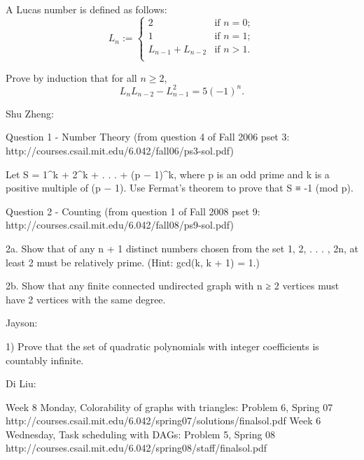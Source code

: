 \begin{problem}[Induction]

A Lucas number is defined as follows:
\begin{equation}
  L_n :=
  \begin{cases}
    2               & \text{if } n = 0; \\
    1               & \text{if } n = 1; \\
    L_{n-1}+L_{n-2} & \text{if } n > 1. \\
   \end{cases}
\end{equation}

Prove by induction that for all $n \geq 2$,
\[
L_n L_{n-2} - L_{n-1}^2 = 5 (-1)^n.
\]
\end{problem}


Shu Zheng:

Question 1 - Number Theory (from question 4 of Fall 2006 pset 3:
http://courses.csail.mit.edu/6.042/fall06/ps3-sol.pdf)

Let S = 1^k + 2^k + . . . + (p − 1)^k, where p is an odd prime and k
is a positive multiple of (p − 1). Use Fermat’s theorem to prove that
S ≡ -1 (mod p).

Question 2 - Counting (from question 1 of Fall 2008 pset 9:
http://courses.csail.mit.edu/6.042/fall08/ps9-sol.pdf)

2a. Show that of any n + 1 distinct numbers chosen from the set {1, 2,
  . . . , 2n}, at least 2 must be relatively prime. (Hint: gcd(k, k +
1) = 1.)

2b. Show that any finite connected undirected graph with n ≥ 2
vertices must have 2 vertices with the same degree.


Jayson:

1) Prove that the set of quadratic polynomials with integer
coefficients is countably infinite.


Di Liu:

Week 8 Monday, Colorability of graphs with triangles: Problem 6, Spring 07
http://courses.csail.mit.edu/6.042/spring07/solutions/finalsol.pdf
Week 6 Wednesday, Task scheduling with DAGs: Problem 5, Spring 08
http://courses.csail.mit.edu/6.042/spring08/staff/finalsol.pdf
